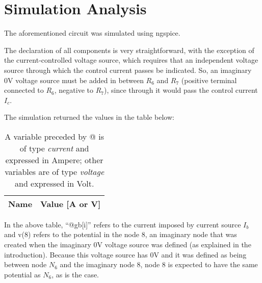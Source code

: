 \section{Simulation Analysis}
\label{sec:simulation}


\par
The aforementioned circuit was simulated using ngspice.
\par
The declaration of all components is very straightforward, with the exception of the current-controlled voltage source, which requires that an independent voltage source through which the control current passes be indicated. So, an imaginary 0V voltage source must be added in between $R_6$ and $R_7$ (positive terminal connected to $R_6$, negative to $R_7$), since through it would pass the control current $I_c$.
\par
The simulation returned the values in the table below:
\par

\begin{table}[h]
  \centering
  \begin{tabular}{|l|r|}
    \hline    
    {\bf Name} & {\bf Value [A or V]} \\ \hline
    
  \end{tabular}
  \caption{A variable preceded by @ is of type {\em current} and expressed in Ampere; other variables are of type {\it voltage} and expressed in Volt.}
  \label{tab:sim}
\end{table}

In the above table, ``@gb[i]'' refers to the current imposed by current source $I_b$ and v(8) refers to the potential in the node 8, an imaginary node that was created when the imaginary 0V voltage source was defined (as explained in the introduction). Because this voltage source has 0V and it was defined as being between node $N_6$ and the imaginary node 8, node 8 is expected to have the same potential as $N_6$, as is the case.


